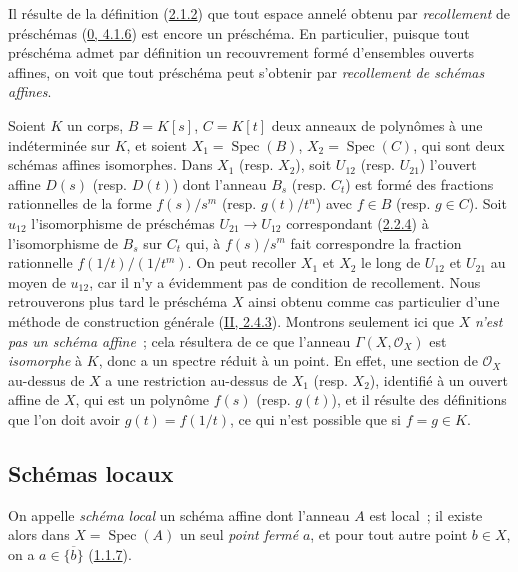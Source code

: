\begin{env}[2.3.1]
\label{I.2.3.1-fr}
Il résulte de la définition (\hyperref[I.2.1.2-fr]{2.1.2}) que tout espace
annelé obtenu par \emph{recollement} de préschémas
(\hyperref[0.4.1.6-fr]{0, 4.1.6}) est encore un préschéma. En particulier,
puisque tout préschéma admet par définition un recouvrement formé d'ensembles
ouverts affines, on voit que tout préschéma peut s'obtenir par
\emph{recollement de schémas affines}.
\end{env}

\begin{example}[2.3.2]
\label{I.2.3.2-fr}
Soient $K$ un corps, $B=K[s]$, $C=K[t]$ deux anneaux de polynômes à une
indéterminée sur $K$, et soient $X_1=\operatorname{Spec}(B)$,
$X_2=\operatorname{Spec}(C)$, qui sont deux schémas affines isomorphes. Dans
$X_1$ (resp. $X_2$), soit $U_{12}$ (resp. $U_{21}$) l'ouvert affine $D(s)$
(resp. $D(t)$) dont l'anneau $B_s$ (resp. $C_t$) est formé des fractions
rationnelles de la forme $f(s)/s^m$ (resp. $g(t)/t^n$) avec $f\in B$
(resp. $g\in C$). Soit $u_{12}$ l'isomorphisme de préschémas
$U_{21}\to U_{12}$ correspondant (\hyperref[I.2.2.4-fr]{2.2.4}) à
l'isomorphisme de $B_s$ sur $C_t$ qui, à $f(s)/s^m$ fait correspondre la
fraction rationnelle $f(1/t)/(1/t^m)$. On peut recoller $X_1$ et $X_2$ le long
de $U_{12}$ et $U_{21}$ au moyen de $u_{12}$, car il n'y a évidemment pas de
condition de recollement. Nous retrouverons plus tard le préschéma $X$ ainsi
obtenu comme cas particulier d'une méthode de construction générale
(\hyperref[II.2.4.3-fr]{II, 2.4.3}). Montrons seulement ici que $X$ \emph{n'est
pas un schéma affine}~; cela résultera de ce que l'anneau
$\Gamma(X,\mathscr{O}_X)$ est \emph{isomorphe} à $K$, donc a un spectre réduit
à un point. En effet, une section de $\mathscr{O}_X$ au-dessus de $X$ a une
restriction au-dessus de $X_1$ (resp. $X_2$), identifié à un ouvert affine de
$X$, qui est un polynôme $f(s)$ (resp. $g(t)$), et il résulte des définitions
que l'on doit avoir $g(t)=f(1/t)$, ce qui n'est possible que si $f=g\in K$.
\end{example}

\subsection{Schémas locaux}
\label{subsection:I.2.4-fr}

\begin{env}[2.4.1]
\label{I.2.4.1-fr}
On appelle \emph{schéma local} un schéma affine dont l'anneau $A$ est local~;
il existe alors dans $X=\operatorname{Spec}(A)$ un seul \emph{point fermé}
$a$, et pour tout autre point $b\in X$, on a
$a\in\overline{\{b\}}$ (\hyperref[I.1.1.7-fr]{1.1.7}).
\end{env}

